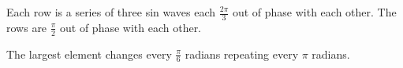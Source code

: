








Each row is a series of three sin waves each $\frac{2\pi}{3}$ out of phase with each other. The rows are $\frac{\pi}{2}$ out of phase with each other.

The largest element changes every $\frac{\pi}{6}$ radians repeating every $\pi$ radians.


%

















